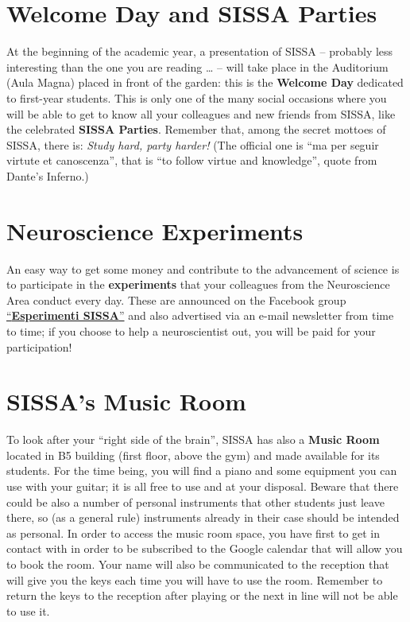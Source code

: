 \documentclass{sissavademecum}
\begin{document}
\section{Welcome Day and SISSA Parties}

At the beginning of the academic year, a presentation of SISSA -- probably less interesting than the one you are reading {\dots} -- will take place in the Auditorium (Aula Magna) placed in front of the garden: this is the \textbf{Welcome Day} dedicated to first-year students. This is only one of the many social occasions where you will be able to get to know all your colleagues and new friends from SISSA, like the celebrated \textbf{SISSA Parties}. Remember that, among the secret mottoes of SISSA, there is: \textit{Study hard, party harder!} (The official one is ``ma per seguir virtute et canoscenza'', that is ``to follow virtue and knowledge'', quote from Dante's Inferno.) 


\section{Neuroscience Experiments}

An easy way to get some money and contribute to the advancement of science is to participate in the \textbf{experiments} that your colleagues from the Neuroscience Area conduct every day. These are announced on the Facebook group \href{https://www.facebook.com/groups/144096472323480}{``\textbf{Esperimenti SISSA}''} and also advertised via an e-mail newsletter from time to time; if you choose to help a neuroscientist out, you will be paid for your participation!


\section{SISSA's Music Room}

To look after your ``right side of the brain'', SISSA has also a \textbf{Music Room} located in B5 building (first floor, above the gym) and made available for its students. For the time being, you will find a piano and some equipment you can use with your guitar; it is all free to use and at your disposal. Beware that there could be also a number of personal instruments that other students just leave there, so (as a general rule) instruments already in their case should be intended as personal. In order to access the music room space, you have first to get in contact with  in order to be subscribed to the Google calendar that will allow you to book the room. Your name will also be communicated to the reception that will give you the keys each time you will have to use the room. Remember to return the keys to the reception after playing or the next in line will not be able to use it.
\end{document}
